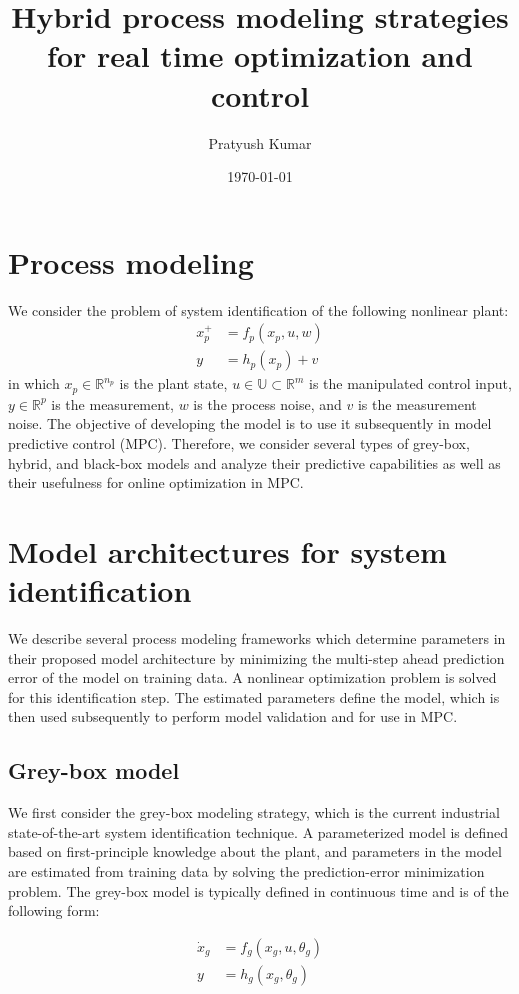 \documentclass[10pt]{article}
\title{Hybrid process modeling strategies for real time optimization and control}
\author{Pratyush Kumar}
\date{\today}
\newcommand{\bbR}{\mathbb{R}} \newcommand{\bbW}{\mathbb{W}}
\newcommand{\bbU}{\mathbb{U}} \newcommand{\bbI}{\mathbb{I}}
\begin{document}
\maketitle

\section{Process modeling}
We consider the problem of system identification of the following nonlinear
plant:
\begin{align*}
  x_p^+ &= f_p(x_p, u, w) \\
  y &= h_p(x_p) + v
\end{align*}
in which $x_p \in \bbR^{n_p}$ is the plant state, $u \in \bbU \subset \bbR^m$ is
the manipulated control input, $y \in \bbR^p$ is the measurement, $w$ is the
process noise, and $v$ is the measurement noise. The objective of developing the
model is to use it subsequently in model predictive control (MPC). Therefore, we
consider several types of grey-box, hybrid, and black-box models and analyze
their predictive capabilities as well as their usefulness for online
optimization in MPC. 

\section{Model architectures for system identification}
We describe several process modeling frameworks which determine parameters in
their proposed model architecture by minimizing the multi-step ahead prediction
error of the model on training data. A nonlinear optimization problem is solved
for this identification step. The estimated parameters define the model, which
is then used subsequently to perform model validation and for use in MPC.

\subsection{Grey-box model}
We first consider the grey-box modeling strategy, which is the current
industrial state-of-the-art system identification technique. A parameterized
model is defined based on first-principle knowledge about the plant, and
parameters in the model are estimated from training data by solving the
prediction-error minimization problem. The grey-box model is typically defined
in continuous time and is of the following form:

\begin{align*}
  \dot{x}_g &= f_g(x_g, u, \theta_g) \\
  y &= h_g(x_g, \theta_g)
\end{align*}
\end{document}
